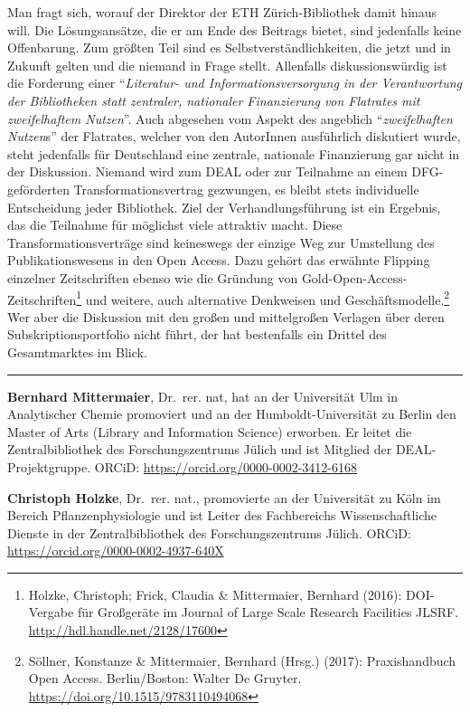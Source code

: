 \documentclass[a4paper,
fontsize=11pt,
oneside,
numbers=noperiodatend,
parskip=half-,
bibliography=totoc,
final
]{scrartcl}
\begin{document}
Man fragt sich, worauf der Direktor der ETH Zürich-Bibliothek damit
hinaus will. Die Lösungsansätze, die er am Ende des Beitrags bietet,
sind jedenfalls keine Offenbarung. Zum größten Teil sind es
Selbstverständlichkeiten, die jetzt und in Zukunft gelten und die
niemand in Frage stellt. Allenfalls diskussionswürdig ist die Forderung
einer \enquote{\emph{Literatur- und Informationsversorgung in der
Verantwortung der Bibliotheken statt zentraler, nationaler Finanzierung
von Flatrates mit zweifelhaftem Nutzen}}. Auch abgesehen vom Aspekt des
angeblich \enquote{\emph{zweifelhaften Nutzen}s} der Flatrates, welcher
von den AutorInnen ausführlich diskutiert wurde, steht jedenfalls für
Deutschland eine zentrale, nationale Finanzierung gar nicht in der
Diskussion. Niemand wird zum DEAL oder zur Teilnahme an einem
DFG-geförderten Transformationsvertrag gezwungen, es bleibt stets
individuelle Entscheidung jeder Bibliothek. Ziel der Verhandlungsführung
ist ein Ergebnis, das die Teilnahme für möglichst viele attraktiv macht.
Diese Transformationsverträge sind keineswegs der einzige Weg zur
Umstellung des Publikationswesens in den Open Access. Dazu gehört das
erwähnte Flipping einzelner Zeitschriften ebenso wie die Gründung von
Gold-Open-Access-Zeitschriften\footnote{Holzke, Christoph; Frick,
  Claudia \& Mittermaier, Bernhard (2016): DOI-Vergabe für Großgeräte im
  Journal of Large Scale Research Facilities JLSRF.
  \url{http://hdl.handle.net/2128/17600}} und weitere, auch alternative
Denkweisen und Geschäftsmodelle.\footnote{Söllner, Konstanze \&
  Mittermaier, Bernhard (Hrsg.) (2017): Praxishandbuch Open Access.
  Berlin/Boston: Walter De Gruyter.
  \url{https://doi.org/10.1515/9783110494068}} Wer aber die Diskussion
mit den großen und mittelgroßen Verlagen über deren
Subskriptionsportfolio nicht führt, der hat bestenfalls ein Drittel des
Gesamtmarktes im Blick.

\begin{center}\rule{0.5\linewidth}{\linethickness}\end{center}

\textbf{Bernhard Mittermaier}, Dr.~rer. nat, hat an der Universität Ulm
in Analytischer Chemie promoviert und an der Humboldt-Universität zu
Berlin den Master of Arts (Library and Information Science) erworben. Er
leitet die Zentralbibliothek des Forschungszentrums Jülich und ist
Mitglied der DEAL-Projektgruppe. ORCiD:
\href{https://orcid.org/0000-0002-3412-6168}{https://orcid.org/0000-0002-3412-6168}

\textbf{Christoph Holzke}, Dr.~rer. nat., promovierte an der Universität
zu Köln im Bereich Pflanzenphysiologie und ist Leiter des Fachbereichs
Wissenschaftliche Dienste in der Zentralbibliothek des
Forschungszentrums Jülich. ORCiD:
\href{https://orcid.org/0000-0002-4937-640X}{https://orcid.org/0000-0002-4937-640X}
\end{document}
